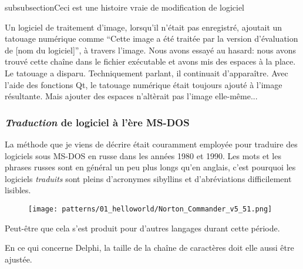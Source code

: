 subsubsection{Ceci est une histoire vraie de modification de logiciel}
\myindex{\SoftwareCracking}

Un logiciel de traitement d'image, lorsqu'il n'était pas enregistré, ajoutait un
tatouage numérique comme ``Cette image a été traitée par la version d'évaluation
de [nom du logiciel]'', à travers l'image.
Nous avons essayé au hasard: nous avons trouvé cette chaîne dans le fichier exécutable
et avons mis des espaces à la place.
Le tatouage a disparu.
Techniquement parlant, il continuait d'apparaître.
Avec l'aide des fonctions Qt, le tatouage numérique était toujours ajouté à l'image
résultante.
Mais ajouter des espaces n'altèrait pas l'image elle-même...

\subsubsection{\emph{Traduction} de logiciel à l'ère MS-DOS}

La méthode que je viens de décrire était couramment employée pour traduire des logiciels sous MS-DOS en russe dans les
années 1980 et 1990.
Les mots et les phrases russes sont en général un peu plus longs qu'en anglais, c'est pourquoi les logiciels
\emph{traduits} sont pleins d'acronymes sibyllins et d'abréviations difficilement lisibles.

\begin{figure}[H]
\centering
\texttt{[image: patterns/01\_helloworld/Norton\_Commander\_v5\_51.png]}
\caption{\FRph{}}
\end{figure}

Peut-être que cela s'est produit pour d'autres langages durant cette période.

En ce qui concerne Delphi, la taille de la chaîne de caractères doit elle aussi être ajustée.
